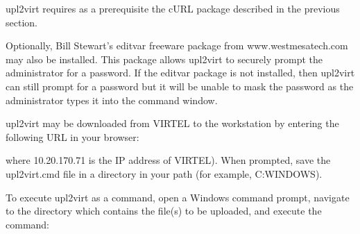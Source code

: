 \documentclass[letterpaper,10pt,english]{sphinxmanual}
\begin{document}
\sphinxAtStartPar
{}

\sphinxAtStartPar
upl2virt requires as a pre\sphinxhyphen{}requisite the cURL package described in the previous section.

\sphinxAtStartPar
Optionally, Bill Stewart’s editvar freeware package from www.westmesatech.com may also be installed. This package allows upl2virt to securely prompt the administrator for a password. If the editvar package is not installed, then upl2virt can still prompt for a password but it will be unable to mask the password as the administrator types it into
the command window.

\sphinxAtStartPar
{}

\sphinxAtStartPar
upl2virt may be downloaded from VIRTEL to the workstation by entering the following URL in your browser:

\begin{sphinxVerbatim}[commandchars=\\\{\}]
\end{sphinxVerbatim}

\sphinxAtStartPar
where 10.20.170.71 is the IP address of VIRTEL). When prompted, save the upl2virt.cmd file in a directory in your path (for example, C:WINDOWS).

\sphinxAtStartPar
{}

\ignorespaces 
\sphinxAtStartPar
To execute upl2virt as a command, open a Windows command prompt, navigate to the directory which contains the file(s) to be uploaded, and execute the command:

\begin{sphinxVerbatim}[commandchars=\\\{\}]
 \PYG{p}{[} \PYG{p}{]}    
         \PYG{p}{[} \PYG{p}{]} \PYG{p}{[}\PYG{p}{]} \PYG{p}{[} \PYG{p}{]} \PYG{p}{[}\PYG{p}{]} \PYG{p}{[}  \PYG{p}{]}
\end{sphinxVerbatim}
\end{document}
